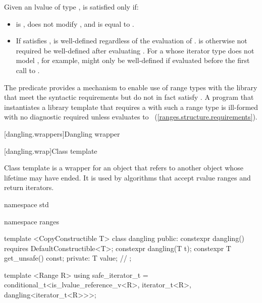 \begin{itemdescr}
\pnum
Given an lvalue  of type ,
 is satisfied only if:

\begin{itemize}
\item {} is , does not modify , and is equal
to .

\item If  satisfies ,
 is well-defined regardless of the evaluation of
. \enternote {} is otherwise not required be
well-defined after evaluating . For a 
whose iterator type does not model , for
example,  might only be well-defined if evaluated before
the first call to . \exitnote
\end{itemize}

\pnum
\enternote The  predicate provides a mechanism to enable use
of range types with the library that meet the syntactic requirements but do
not in fact satisfy . A program that instantiates a library template
that requires a  with such a range type  is ill-formed with no
diagnostic required unless
 evaluates
to ~(\ref{ranges.structure.requirements}). \exitnote
\end{itemdescr}

[dangling.wrappers]{Dangling wrapper}

[dangling.wrap]{Class template }

\pnum
{}%
Class template  is a wrapper for an object that refers to another object whose
lifetime may have ended. It is used by algorithms that accept rvalue ranges and return iterators.

\begin{codeblock}
namespace std { namespace ranges {
  template <CopyConstructible T>
  class dangling {
  public:
    constexpr dangling() requires DefaultConstructible<T>;
    constexpr dangling(T t);
    constexpr T get_unsafe() const;
  private:
    T value; // \expos
  };

  template <Range R>
  using safe_iterator_t =
    conditional_t<is_lvalue_reference_v<R>,
      iterator_t<R>,
      dangling<iterator_t<R>>>;
}}
\end{codeblock}

